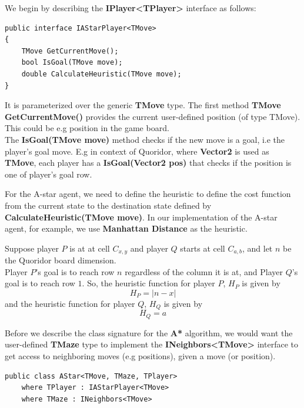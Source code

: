We begin by describing the \textbf{IPlayer\textless{}TPlayer\textgreater{}} interface as follows:
\begin{lstlisting}
public interface IAStarPlayer<TMove>
{
    TMove GetCurrentMove();
    bool IsGoal(TMove move);
    double CalculateHeuristic(TMove move);
}
\end{lstlisting}

It is parameterized over the generic \textbf{TMove} type. The first method \textbf{TMove GetCurrentMove()} provides the current user-defined position (of type TMove). This could be e.g position in the game board.\\
The \textbf{IsGoal(TMove move)} method checks if the new move is a goal, i.e the player's goal move. E.g in context of Quoridor, where \textbf{Vector2} is used as \textbf{TMove}, each player has a \textbf{IsGoal(Vector2 pos)} that checks if the position is one of player's goal row.

For the A-star agent, we need to define the heuristic to define the cost function from the current state to the destination state defined by \textbf{CalculateHeuristic(TMove move)}. In our implementation of the A-star agent, for example, we use \textbf{Manhattan Distance} as the heuristic.

Suppose player $P$ is at at cell $C_{x,y}$ and player $Q$ starts at cell $C_{a,b}$, and let $n$ be the Quoridor board dimension.\\
Player $P$'s goal is to reach row $n$ regardless of the column it is at, and Player $Q$'s goal is to reach row $1$.
So, the heuristic function for player $P$, $H_P$ is given by
\begin{equation}
    H_P = | n - x |
\label{eq:playerPHeuristic}
\end{equation}
and the heuristic function for player $Q$, $H_Q$ is given by
\begin{equation}
\label{eq:playerQHeuristic}
    H_Q = a
\end{equation}

Before we describe the class signature for the \textbf{A*} algorithm, we would want the user-defined \textbf{TMaze} type to implement the \textbf{INeighbors\textless{}TMove\textgreater{}} interface to get access to neighboring moves (e.g positions), given a move (or position).

\begin{lstlisting}
public class AStar<TMove, TMaze, TPlayer>
    where TPlayer : IAStarPlayer<TMove>
    where TMaze : INeighbors<TMove>
\end{lstlisting}


